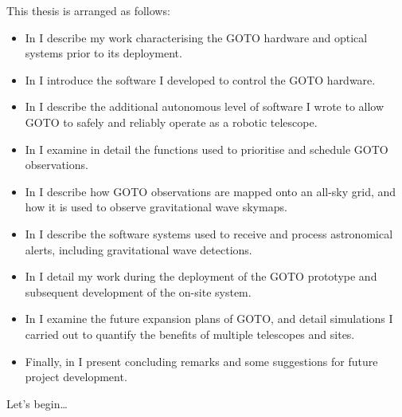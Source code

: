 \begin{colsection}
\newpage

This thesis is arranged as follows:
%
\begin{itemize}
    \item In  I describe my work characterising the GOTO hardware and optical systems prior to its deployment.
    \item In  I introduce the software I developed to control the GOTO hardware.
    \item In  I describe the additional autonomous level of software I wrote to allow GOTO to safely and reliably operate as a robotic telescope.
    \item In  I examine in detail the functions used to prioritise and schedule GOTO observations.
    \item In  I describe how GOTO observations are mapped onto an all-sky grid, and how it is used to observe gravitational wave skymaps.
    \item In  I describe the software systems used to receive and process astronomical alerts, including gravitational wave detections.
    \item In  I detail my work during the deployment of the GOTO prototype and subsequent development of the on-site system.
    \item In  I examine the future expansion plans of GOTO, and detail simulations I carried out to quantify the benefits of multiple telescopes and sites.
    \item Finally, in  I present concluding remarks and some suggestions for future project development.
\end{itemize}
%
Let's begin\ldots

\end{colsection}

